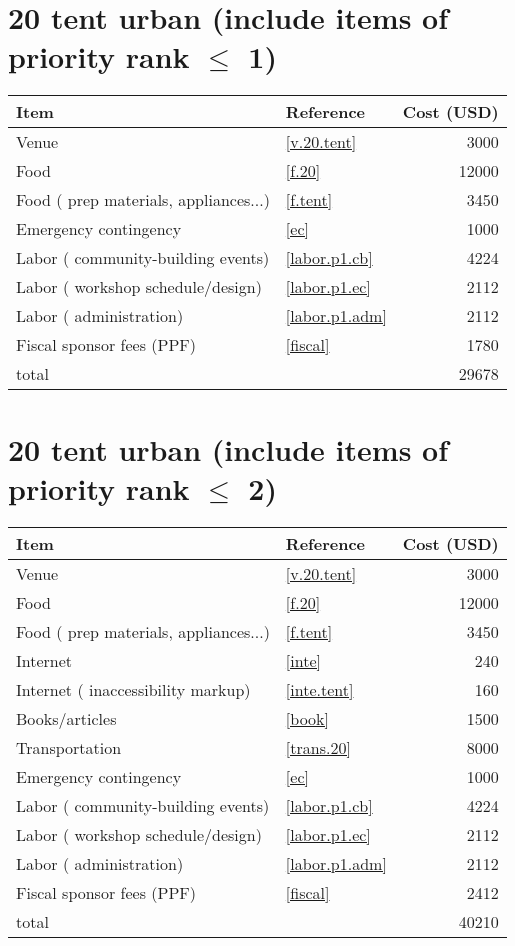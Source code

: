\section*{20 tent urban (include items of priority rank $\leq$ 1)}
\begin{center}
\begin{tabular}{llr}
Item & Reference & Cost (USD) \\ \hline
Venue & \ref{v.20.tent} & 3000 \\
Food & \ref{f.20} & 12000 \\
Food ( prep materials, appliances...) & \ref{f.tent} & 3450 \\
Emergency contingency & \ref{ec} & 1000 \\
Labor ( community-building events) & \ref{labor.p1.cb} & 4224 \\
Labor ( workshop schedule/design) & \ref{labor.p1.ec} & 2112 \\
Labor ( administration) & \ref{labor.p1.adm} & 2112 \\
Fiscal sponsor fees (PPF) & \ref{fiscal} & 1780 \\ \hline
total &  & 29678
\end{tabular}
\end{center}
\newpage
\section*{20 tent urban (include items of priority rank $\leq$ 2)}
\begin{center}
\begin{tabular}{llr}
Item & Reference & Cost (USD) \\ \hline
Venue & \ref{v.20.tent} & 3000 \\
Food & \ref{f.20} & 12000 \\
Food ( prep materials, appliances...) & \ref{f.tent} & 3450 \\
Internet & \ref{inte} & 240 \\
Internet ( inaccessibility markup) & \ref{inte.tent} & 160 \\
Books/articles & \ref{book} & 1500 \\
Transportation & \ref{trans.20} & 8000 \\
Emergency contingency & \ref{ec} & 1000 \\
Labor ( community-building events) & \ref{labor.p1.cb} & 4224 \\
Labor ( workshop schedule/design) & \ref{labor.p1.ec} & 2112 \\
Labor ( administration) & \ref{labor.p1.adm} & 2112 \\
Fiscal sponsor fees (PPF) & \ref{fiscal} & 2412 \\ \hline
total &  & 40210
\end{tabular}
\end{center}
\newpage
